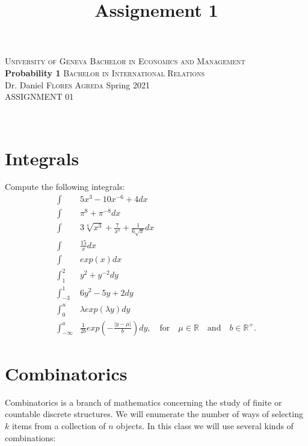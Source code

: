 \documentclass[12pt,a4paper,titlepage]{article}\usepackage[]{graphicx}\usepackage[]{color}
\title{Assignement 1}
\begin{document}
\noindent \textsc{University of Geneva}     \hfill \textsc{Bachelor in Economics and Management} \\
\textbf{Probability 1}                      \hfill \textsc{Bachelor in International Relations} \\
Dr. Daniel \textsc{Flores Agreda}                 \hfill Spring 2021  \\
ASSIGNMENT 01                               \hfill



\noindent
\makebox[\linewidth]{\rule{\textwidth}{0.4pt}}\\[1.5ex]





\section{Integrals}


Compute the following integrals: \\
\begin{align*}
\int& 5x^{3}-10x^{-6}+4 dx \\
\int&  \pi^{8}+\pi^{-8} dx \\
\int& 3\sqrt[4]{x^{3}}+\frac{7}{x^{5}}+\frac{1}{6\sqrt{x}}dx \\
\int& \frac{15}{x}dx \\
\int & exp(x)dx\\
\int_{1}^{2}& y^{2}+y^{-2}dy \\
\int_{-3}^{1}& 6y^{2}-5y+2dy \\
\int_{0}^{u}& \lambda exp(\lambda y) dy \\
\int_{-\infty}^{a}& \frac{1}{2b} exp\left (-\frac{|y-\mu|}{b}\right) dy, \quad \text{for} \quad \mu \in \mathbb{R} \quad \text{and} \quad b \in \mathbb{R}^{+}.
\end{align*}


\vspace{1cm}


\section{Combinatorics}

Combinatorics is a branch of mathematics concerning the study of finite or countable discrete structures.
We will enumerate the number of ways of selecting $k$ items from a collection of $n$ objects.
In this class we will use several kinds of combinations:
\end{document}
